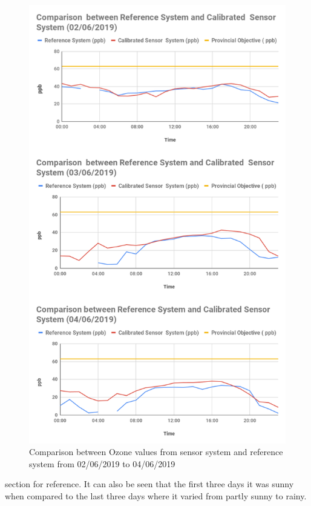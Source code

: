 \begin{figure}[h]
  \begin{center}
  \includegraphics[scale=0.46]{images/figure105.png}
  \end{center}
  \caption{Comparison between Ozone values from sensor system and reference system from 02/06/2019 to 04/06/2019}
  \label{Ozone1}
  \hspace{1 cm}
\end{figure}
\clearpage

section for reference. It can also be seen that the first three days it was sunny when compared to the last three days where it varied from partly sunny to rainy. 

